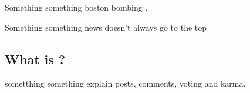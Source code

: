 \lipsum[1]

Something something boston bombing \cite{Potts:2013:IRC:2507065.2507079}.

Something something news doesn't always go to the top \cite{Gilbert:2013:WUR:2441776.2441866}

\subsection{What is \reddit{}?} %
\label{sub:what_is_reddit}
sometthing something explain posts, comments, voting and karma.
